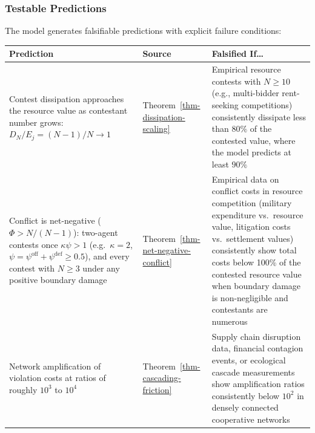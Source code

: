 \documentclass[11pt]{article}
\theoremstyle{plain}
\theoremstyle{definition}
\theoremstyle{remark}
\newcounter{none}
\let\origsubsubsection\subsubsection
\renewcommand{\subsubsection}{\needspace{4\baselineskip}\origsubsubsection}
\begin{document}
\subsubsection{Testable Predictions}\label{testable-predictions-3}

The model generates falsifiable predictions with explicit failure
conditions:

{\def\LTcaptype{none} %
\begin{longtable}[]{@{}
  >{\raggedright\arraybackslash}p{}
  >{\raggedright\arraybackslash}p{}
  >{\raggedright\arraybackslash}p{}@{}}
\toprule\noalign{}
\begin{minipage}[b]{\linewidth}\raggedright
Prediction
\end{minipage} & \begin{minipage}[b]{\linewidth}\raggedright
Source
\end{minipage} & \begin{minipage}[b]{\linewidth}\raggedright
Falsified If\ldots{}
\end{minipage} \\
\midrule\noalign{}
\endhead
\bottomrule\noalign{}
\endlastfoot
Contest dissipation approaches the resource value as contestant number
grows: \(D_N/E_j = (N-1)/N \to 1\) &
Theorem~\ref{thm-dissipation-scaling} & Empirical resource contests with
\(N \geq 10\) (e.g., multi-bidder rent-seeking competitions)
consistently dissipate less than \(80\%\) of the contested value, where
the model predicts at least \(90\%\) \\
Conflict is net-negative (\(\Phi > N/(N-1)\)): two-agent contests once
\(\kappa\psi > 1\) (e.g.~\(\kappa = 2\),
\(\psi = \psi^{\text{off}} + \psi^{\text{def}} \geq 0.5\)), and every
contest with \(N \geq 3\) under any positive boundary damage &
Theorem~\ref{thm-net-negative-conflict} & Empirical data on conflict
costs in resource competition (military expenditure vs.~resource value,
litigation costs vs.~settlement values) consistently show total costs
below 100\% of the contested resource value when boundary damage is
non-negligible and contestants are numerous \\
Network amplification of violation costs at ratios of roughly \(10^3\)
to \(10^4\) & Theorem~\ref{thm-cascading-friction} & Supply chain
disruption data, financial contagion events, or ecological cascade
measurements show amplification ratios consistently below \(10^2\) in
densely connected cooperative networks \\

\end{longtable}}
\end{document}
